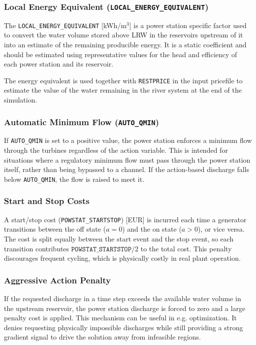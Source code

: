 \documentclass[a4paper, 12pt]{report}
\begin{document}
    \subsubsection{Local Energy Equivalent (\texttt{LOCAL\_ENERGY\_EQUIVALENT})}
    The \texttt{LOCAL\_ENERGY\_EQUIVALENT} [kWh/m$^3$] is a power station specific factor used
    to convert the water volume stored above LRW in the reservoirs upstream of it into an estimate of the remaining producible energy. It is a static coefficient and should be estimated using
    representative values for the head and efficiency of each power station and its reservoir.
    
    The energy equivalent is used together with \texttt{RESTPRICE} in the input pricefile to
    estimate the value of the water remaining in the river system at the end of the simulation.

	\subsubsection{Automatic Minimum Flow (\texttt{AUTO\_QMIN})}

	If \texttt{AUTO\_QMIN} is set to a positive value, the power station enforces a minimum flow
	through the turbines regardless of the action variable. This is intended for situations where
	a regulatory minimum flow must pass through the power station itself, rather than being
	bypassed to a channel. If the action-based discharge falls below \texttt{AUTO\_QMIN}, the
	flow is raised to meet it.

	\subsubsection{Start and Stop Costs}

	A start/stop cost (\texttt{POWSTAT\_STARTSTOP}) [EUR] is incurred each time a generator
	transitions between the off state ($a = 0$) and the on state ($a > 0$), or vice versa. The
	cost is split equally between the start event and the stop event, so each transition
	contributes $\texttt{POWSTAT\_STARTSTOP} / 2$ to the total cost. This penalty discourages
	frequent cycling, which is physically costly in real plant operation.

	\subsubsection{Aggressive Action Penalty}

	If the requested discharge in a time step exceeds the available water volume in the upstream
	reservoir, the power station discharge is forced to zero and a large penalty cost is applied.
	This mechanism can be useful in e.g. optimization. It denies requesting physically impossible discharges while
	still providing a strong gradient signal to drive the solution away from infeasible regions.
	\newpage 
\end{document}
